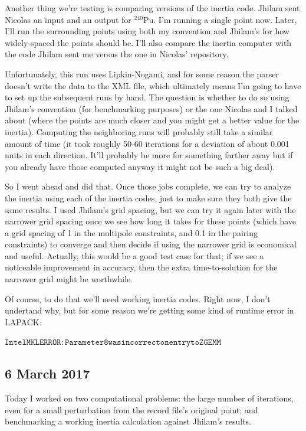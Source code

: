 \documentclass[]{report}
\begin{document}
Another thing we're testing is comparing versions of the inertia code. Jhilam sent Nicolas an input and an output for $^{240}$Pu. I'm running a single point now. Later, I'll run the surrounding points using both my convention and Jhilam's for how widely-spaced the points should be. I'll also compare the inertia computer with the code Jhilam sent me versus the one in Nicolas' repository.

Unfortunately, this run uses Lipkin-Nogami, and for some reason the parser doesn't write the data to the XML file, which ultimately means I'm going to have to set up the subsequent runs by hand. The question is whether to do so using Jhilam's convention (for benchmarking purposes) or the one Nicolas and I talked about (where the points are much closer and you might get a better value for the inertia). Computing the neighboring runs will probably still take a similar amount of time (it took roughly 50-60 iterations for a deviation of about 0.001 units in each direction. It'll probably be more for something farther away but if you already have those computed anyway it might not be such a big deal).

So I went ahead and did that. Once those jobs complete, we can try to analyze the inertia using each of the inertia codes, just to make sure they both give the same results. I used Jhilam's grid spacing, but we can try it again later with the narrower grid spacing once we see how long it takes for these points (which have a grid spacing of 1 in the multipole constraints, and 0.1 in the pairing constraints) to converge and then decide if using the narrower grid is economical and useful. Actually, this would be a good test case for that; if we see a noticeable improvement in accuracy, then the extra time-to-solution for the narrower grid might be worthwhile.

Of course, to do that we'll need working inertia codes. Right now, I don't undertand why, but for some reason we're getting some kind of runtime error in LAPACK:

$\mathtt{Intel MKL ERROR: Parameter 8 was incorrect on entry to ZGEMM}$

\subsection*{6 March 2017}
Today I worked on two computational problems: the large number of iterations, even for a small perturbation from the record file's original point; and benchmarking a working inertia calculation against Jhilam's results.
\end{document}
